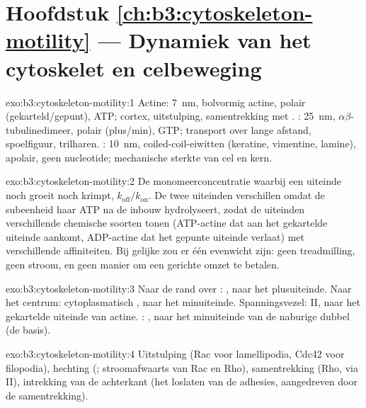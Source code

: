 \section*{Hoofdstuk \ref{ch:b3:cytoskeleton-motility} --- Dynamiek van het cytoskelet en celbeweging}

\begin{solution}{exo:b3:cytoskeleton-motility:1}
Actine: \qty{7}{nm}, bolvormig actine, polair (gekarteld/gepunt), ATP;
cortex, uitstulping, samentrekking met . :
\qty{25}{nm}, $\alpha\beta$-tubulinedimeer, polair (plus/min), GTP;
transport over lange afstand, spoelfiguur, trilharen. : \qty{10}{nm}, coiled-coil-eiwitten (keratine, vimentine,
lamine), apolair, geen nucleotide; mechanische sterkte van cel en kern.
\end{solution}

\begin{solution}{exo:b3:cytoskeleton-motility:2}
De monomeerconcentratie waarbij een uiteinde noch groeit noch krimpt,
$k_{\text{off}}/k_{\text{on}}$. De twee uiteinden verschillen omdat de
subeenheid haar ATP na de inbouw hydrolyseert, zodat de uiteinden
verschillende chemische soorten tonen (ATP-actine dat aan het
gekartelde uiteinde aankomt, ADP-actine dat het gepunte uiteinde
verlaat) met verschillende affiniteiten. Bij gelijke  zou er één evenwicht zijn: geen treadmilling, geen
stroom, en geen manier om een gerichte omzet te betalen.
\end{solution}

\begin{solution}{exo:b3:cytoskeleton-motility:3}
Naar de rand over : , naar het plusuiteinde. Naar
het centrum: cytoplasmatisch , naar het minuiteinde.
Spanningsvezel:  II, naar het gekartelde uiteinde van actine.
: , naar het minuiteinde van de naburige
dubbel (de basis).
\end{solution}

\begin{solution}{exo:b3:cytoskeleton-motility:4}
Uitstulping (Rac voor lamellipodia, Cdc42 voor filopodia), hechting
(; stroomafwaarts van Rac en Rho), samentrekking (Rho, via
 II), intrekking van de achterkant (het loslaten van de
adhesies, aangedreven door de samentrekking).
\end{solution}

